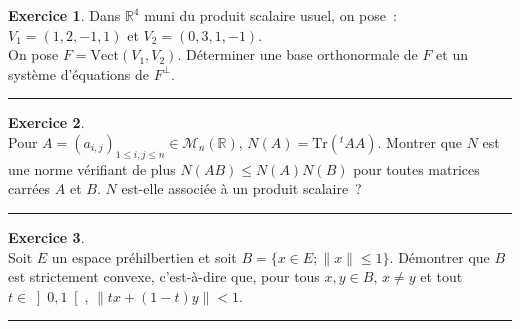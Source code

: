 \documentclass[a4paper,10pt]{article}
\theoremstyle{definition}
\theoremstyle{definition}
\newtheorem{exo}{Exercice}
\newcommand{\R}{\mathbb{R}}
\begin{document}
\begin{minipage}{1\linewidth}
\begin{minipage}[t]{0.48\linewidth}
\begin{exo}
			
			Dans $\R^4$ muni du produit scalaire usuel, on pose~:~$V_1=(1,2,-1,1)$ et $V_2=(0,3,1,-1)$.\\
			On pose $F=\mbox{Vect}(V_1,V_2)$. Déterminer une base orthonormale de $F$ et un système d'équations de $F^\bot$.
			
			\centering
			\rule{1\linewidth}{0.6pt}
		\end{exo}
		
		
		
		\begin{exo}\quad\\[0.25cm]
			Pour $A=(a_{i,j})_{1\leq i,j\leq n}\in\mathcal{M}_n(\R)$, $N(A)=\mbox{Tr}(^tAA)$. Montrer que $N$ est une norme vérifiant de plus $N(AB)\leq N(A)N(B)$ pour toutes matrices carrées $A$ et $B$. $N$ est-elle associée à un produit scalaire~?			
			
			\centering
			\rule{1\linewidth}{0.6pt}
		\end{exo}
		
		
		\begin{exo}\quad\\[0.25cm]
			Soit $E$ un espace préhilbertien et soit $B=\{x\in E; \|x\| \leq 1\}$. Démontrer que $B$ est strictement convexe, c'est-à-dire que, pour tous $x,y\in B$, $x \neq y$ et tout $t\in \left]0,1\right[ $, $\|tx+(1-t)y\|<1$.
			
			\centering
			\rule{1\linewidth}{0.6pt}
		\end{exo}
		
		
	\end{minipage}
\end{minipage}
\end{document}
